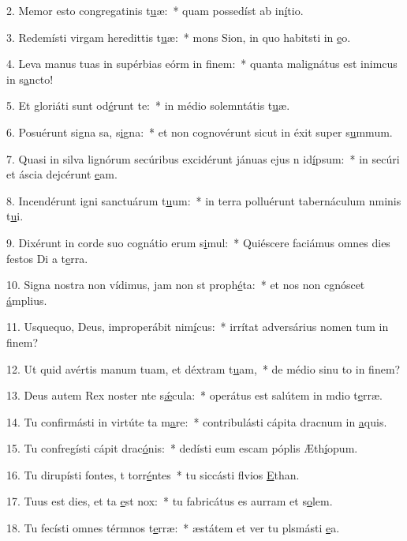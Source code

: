 2. Memor esto congregatinis t\uline{u}æ:~* quam possedíst ab in\uline{í}tio.\par 
3. Redemísti virgam heredittis t\uline{u}æ:~* mons Sion, in quo habitsti in \uline{e}o.\par 
4. Leva manus tuas in supérbias eórm in f\uline{i}nem:~* quanta malignátus est inimcus in s\uline{a}ncto!\par 
5. Et gloriáti sunt  od\uline{é}runt te:~* in médio solemntátis t\uline{u}æ.\par 
6. Posuérunt signa sa, s\uline{i}gna:~* et non cognovérunt sicut in éxit super s\uline{u}mmum.\par 
7. Quasi in silva lignórum secúribus excidérunt jánuas ejus n id\uline{í}psum:~* in secúri et áscia dejcérunt \uline{e}am.\par 
8. Incendérunt igni sanctuárum t\uline{u}um:~* in terra polluérunt tabernáculum nminis t\uline{u}i.\par 
9. Dixérunt in corde suo cognátio erum s\uline{i}mul:~* Quiéscere faciámus omnes dies festos Di a t\uline{e}rra.\par 
10. Signa nostra non vídimus, jam non st proph\uline{é}ta:~* et nos non cgnóscet \uline{á}mplius.\par 
11. Usquequo, Deus, improperábit nim\uline{í}cus:~* irrítat adversárius nomen tum in f\uline{i}nem?\par 
12. Ut quid avértis manum tuam, et déxtram t\uline{u}am,~* de médio sinu to in f\uline{i}nem?\par 
13. Deus autem Rex noster nte s\uline{ǽ}cula:~* operátus est salútem in mdio t\uline{e}rræ.\par 
14. Tu confirmásti in virtúte ta m\uline{a}re:~* contribulásti cápita dracnum in \uline{a}quis.\par 
15. Tu confregísti cápit drac\uline{ó}nis:~* dedísti eum escam póplis Æth\uline{í}opum.\par 
16. Tu dirupísti fontes, t torr\uline{é}ntes~* tu siccásti flvios \uline{E}than.\par 
17. Tuus est dies, et ta \uline{e}st nox:~* tu fabricátus es aurram et s\uline{o}lem.\par 
18. Tu fecísti omnes térmnos t\uline{e}rræ:~* æstátem et ver tu plsmásti \uline{e}a.\par 
